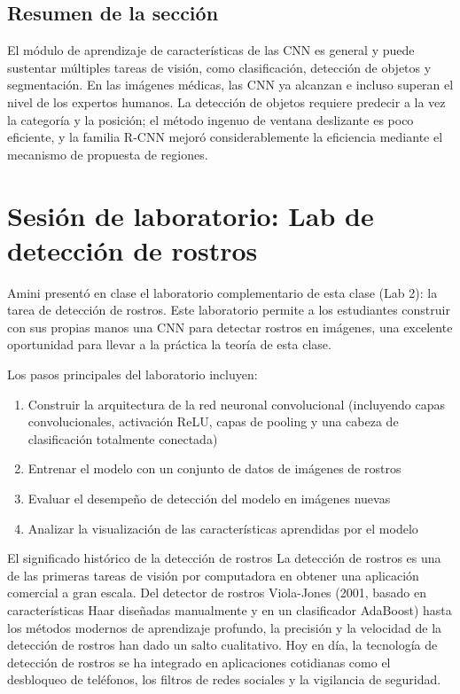 \documentclass[a4paper]{article}
\begin{document}
\subsection{Resumen de la sección}

El módulo de aprendizaje de características de las CNN es general y puede sustentar múltiples tareas de visión, como clasificación, detección de objetos y segmentación. En las imágenes médicas, las CNN ya alcanzan e incluso superan el nivel de los expertos humanos. La detección de objetos requiere predecir a la vez la categoría y la posición; el método ingenuo de ventana deslizante es poco eficiente, y la familia R-CNN mejoró considerablemente la eficiencia mediante el mecanismo de propuesta de regiones.

\newpage
\section{Sesión de laboratorio: Lab de detección de rostros}

Amini presentó en clase el laboratorio complementario de esta clase (Lab 2): la tarea de detección de rostros. Este laboratorio permite a los estudiantes construir con sus propias manos una CNN para detectar rostros en imágenes, una excelente oportunidad para llevar a la práctica la teoría de esta clase.

Los pasos principales del laboratorio incluyen:
\begin{enumerate}
    \item Construir la arquitectura de la red neuronal convolucional (incluyendo capas convolucionales, activación ReLU, capas de pooling y una cabeza de clasificación totalmente conectada)
    \item Entrenar el modelo con un conjunto de datos de imágenes de rostros
    \item Evaluar el desempeño de detección del modelo en imágenes nuevas
    \item Analizar la visualización de las características aprendidas por el modelo
\end{enumerate}

\begin{knowledgebox}{El significado histórico de la detección de rostros}
La detección de rostros es una de las primeras tareas de visión por computadora en obtener una aplicación comercial a gran escala. Del detector de rostros Viola-Jones (2001, basado en características Haar diseñadas manualmente y en un clasificador AdaBoost) hasta los métodos modernos de aprendizaje profundo, la precisión y la velocidad de la detección de rostros han dado un salto cualitativo. Hoy en día, la tecnología de detección de rostros se ha integrado en aplicaciones cotidianas como el desbloqueo de teléfonos, los filtros de redes sociales y la vigilancia de seguridad.
\end{knowledgebox}
\end{document}
